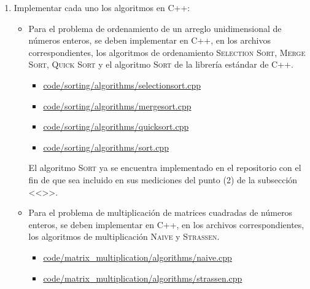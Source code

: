 \begin{enumerate}[(1)]
    \item Implementar cada uno los algoritmos en C++:
    \begin{itemize}
        \item Para el problema de ordenamiento de un arreglo unidimensional de números enteros, se deben implementar en C++, en los archivos correspondientes, los algoritmos de ordenamiento \textsc{Selection Sort}, \textsc{Merge Sort}, \textsc{Quick Sort} y el algoritmo \textsc{Sort} de la librería estándar de C++. 
    \begin{itemize}
        \item \href{https://github.com/pabloealvarez/INF221-2025-1-TAREA-1/blob/master/code/sorting/algorithms/selectionsort.cpp}{code/sorting/algorithms/selectionsort.cpp}
        \item \href{https://github.com/pabloealvarez/INF221-2025-1-TAREA-1/blob/master/code/sorting/algorithms/mergesort.cpp}{code/sorting/algorithms/mergesort.cpp}
        \item \href{https://github.com/pabloealvarez/INF221-2025-1-TAREA-1/blob/master/code/sorting/algorithms/quicksort.cpp}{code/sorting/algorithms/quicksort.cpp}
        \item \href{https://github.com/pabloealvarez/INF221-2025-1-TAREA-1/blob/master/code/sorting/algorithms/sort.cpp}{code/sorting/algorithms/sort.cpp}
    \end{itemize}
    El algoritmo \textsc{Sort} ya se encuentra implementado en el repositorio con el fin de que sea incluido en sus mediciones del punto (2) de la subsección <<>>.
    
        \item Para el problema de multiplicación de matrices cuadradas de números enteros, se deben implementar en C++, en los archivos correspondientes, los algoritmos de multiplicación \textsc{Naive} y \textsc{Strassen}.
    \begin{itemize}
        \item \href{https://github.com/pabloealvarez/INF221-2025-1-TAREA-1/blob/master/code/matrix_multiplication/algorithms/naive.cpp}{code/matrix\_multiplication/algorithms/naive.cpp}
        \item \href{https://github.com/pabloealvarez/INF221-2025-1-TAREA-1/blob/master/code/matrix_multiplication/algorithms/strassen.cpp}{code/matrix\_multiplication/algorithms/strassen.cpp}
    \end{itemize}
    \end{itemize}


\end{enumerate}
